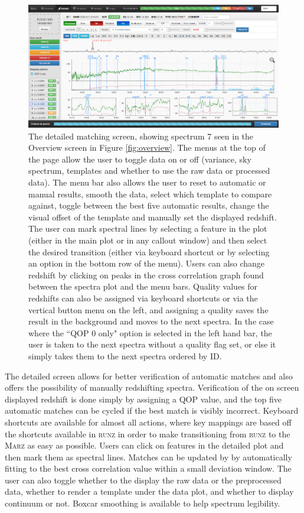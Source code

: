 \documentclass[iop]{emulateapj}
\newcommand{\runz}{\textsc{runz}}
\newcommand{\marz}{\textsc{Marz}}
\begin{document}
\begin{figure}[H]
\centering
\includegraphics[width=\textwidth]{InterfaceZ2.png}
\caption{The detailed matching screen, showing spectrum 7 seen in the Overview screen in Figure \ref{fig:overview}. The menus at the top of the page allow the user to toggle data on or off (variance, sky spectrum, templates and whether to use the raw data or processed data). The menu bar also allows the user to reset to automatic or manual results, smooth the data, select which template to compare against, toggle between the best five automatic results, change the visual offset of the template and manually set the displayed redshift. The user can mark spectral lines by selecting a feature in the plot (either in the main plot or in any callout window) and then select the desired transition (either via keyboard shortcut or by selecting an option in the bottom row of the menu). Users can also change redshift by clicking on peaks in the cross correlation graph found between the spectra plot and the menu bars. Quality values for redshifts can also be assigned via keyboard shortcuts or via the vertical button menu on the left, and assigning a quality saves the result in the background and moves to the next spectra. In the case where the ``QOP 0 only" option is selected in the left hand bar, the user is taken to the next spectra without a quality flag set, or else it simply takes them to the next spectra ordered by ID.}
\label{fig:detailed}
\end{figure}

The detailed screen allows for better verification of automatic matches and also offers the possibility of manually redshifting spectra. Verification of the on screen displayed redshift is done simply by assigning a QOP value, and the top five automatic matches can be cycled if the best match is visibly incorrect. Keyboard shortcuts are available for almost all actions, where key mappings are based off the shortcuts available in \runz{} in order to make transitioning from \runz{} to the \marz{} as easy as possible. Users can click on features in the detailed plot and then mark them as spectral lines. Matches can be updated by by automatically fitting to the best cross correlation value within a small deviation window. The user can also toggle whether to the display the raw data or the preprocessed data, whether to render a template under the data plot, and whether to display continuum or not. Boxcar smoothing is available to help spectrum legibility.\\
\end{document}
